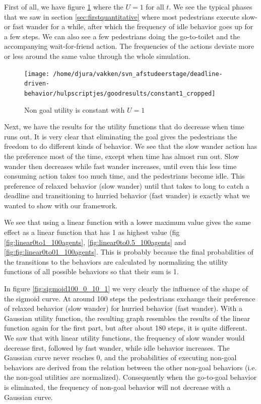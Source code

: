 \documentclass[11pt]{book}
\begin{document}
First of all, we have figure \ref{fig:constant1} where the $U=1$ for all $t$. We see the typical phases that we saw in section \ref{sec:firstquantitative} where most pedestrians execute slow- or fast wander for a while, after which the frequency of idle behavior goes up for a few steps. We can also see a few pedestrians doing the go-to-toilet and the accompanying wait-for-friend action. The frequencies of the actions deviate more or less around the same value through the whole simulation.

\begin{figure}
\centering
\texttt{[image: /home/djura/vakken/svn\_afstudeerstage/deadline-driven-behavior/hulpscriptjes/goodresults/constant1\_cropped]}
\caption{Non goal utility is constant with $U=1$}
\label{fig:constant1}
\end{figure}

Next, we have the results for the utility functions that do decrease when time runs out. It is very clear that eliminating the goal gives the pedestrians the freedom to do different kinds of behavior. We see that the slow wander action has the preference most of the time, except when time has almost run out. Slow wander then decreases while fast wander increases, until even this less time consuming action takes too much time, and the pedestrians become idle. This preference of relaxed behavior (slow wander) until that takes to long to catch a deadline and transitioning to hurried behavior (fast wander) is exactly what we wanted to show with our framework.

We see that using a linear function with a lower maximum value gives the same effect as a linear function that has 1 as highest value (fig \ref{fig:linear0to1_100agents}, \ref{fig:linear0to0.5_100agents} and \ref{fig:fig:linear0to01_100agents}. This is probably because the final probabilities of the transitions to the behaviors are calculated by normalizing the utility functions of all possible behaviors so that their sum is 1.

In figure \ref{fig:sigmoid100_0_10_1} we very clearly the influence of the shape of the sigmoid curve. At around 100 steps the pedestrians exchange their preference of relaxed behavior (slow wander) for hurried behavior (fast wander). With a Gaussian utility function, the resulting graph resembles the results of the linear function again for the first part, but after about 180 steps, it is quite different. We saw that with linear utility functions, the frequency of slow wander would decrease first, followed by fast wander, while idle behavior increases. The Gaussian curve never reaches 0, and the probabilities of executing non-goal behaviors are derived from the relation between the other non-goal behaviors (i.e. the non-goal utilities are normalized). Consequently when the go-to-goal behavior is eliminated, the frequency of non-goal behavior will not decrease with a Gaussian curve.
\end{document}
